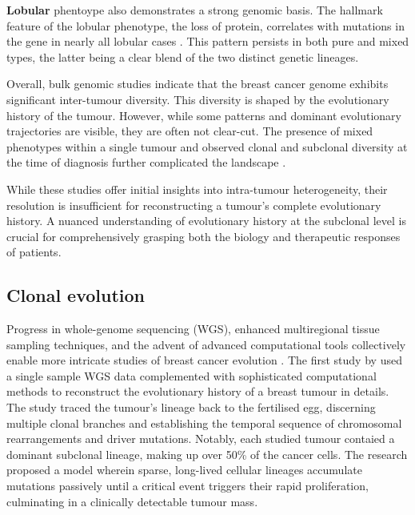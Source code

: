 \textbf{Lobular} phentoype also demonstrates a strong genomic basis. The hallmark feature of the lobular phenotype, the loss of  protein, correlates with mutations in the  gene in nearly all lobular cases \parencite{Ciriello2015-ey}. This pattern persists in both pure and mixed types, the latter being a clear blend of the two distinct genetic lineages.


Overall, bulk genomic studies indicate that the breast cancer genome exhibits significant inter-tumour diversity. This diversity is shaped by the evolutionary history of the tumour. However, while some patterns and dominant evolutionary trajectories are visible, they are often not clear-cut. The presence of mixed phenotypes within a single tumour and observed clonal and subclonal diversity at the time of diagnosis further complicated the landscape \parencite{Ciriello2015-ey,Pereira2016-ov,Shah2012-xz}. 

While these studies offer initial insights into intra-tumour heterogeneity, their resolution is insufficient for reconstructing a tumour's complete evolutionary history. A nuanced understanding of evolutionary history at the subclonal level is crucial for comprehensively grasping both the biology and therapeutic responses of patients.

\subsection{Clonal evolution}

Progress in whole-genome sequencing (WGS), enhanced multiregional tissue sampling techniques, and the advent of advanced computational tools collectively enable more intricate studies of breast cancer evolution . The first study by \textcite{Nik-Zainal2012-zz} used a single sample \ac{WGS} data complemented with sophisticated computational methods to reconstruct the evolutionary history of a breast tumour in details. The study traced the tumour's lineage back to the fertilised egg, discerning multiple clonal branches and establishing the temporal sequence of chromosomal rearrangements and driver mutations. Notably, each studied tumour contaied a dominant subclonal lineage, making up over 50\% of the cancer cells. The research proposed a model wherein sparse, long-lived cellular lineages accumulate mutations passively until a critical event triggers their rapid proliferation, culminating in a clinically detectable tumour mass. 


